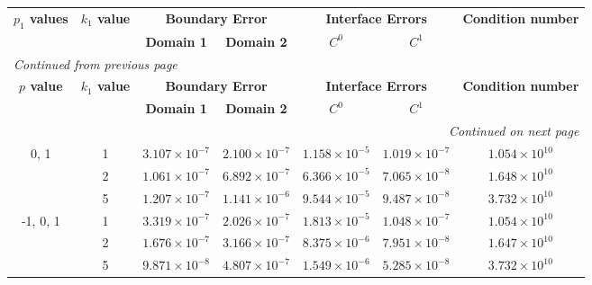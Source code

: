 \begin{table}[htbp]
    \centering
    \begin{longtable}{ccccccc}
        \toprule
        \multicolumn{1}{c}{\textbf{\(p_1\) values}} & \multicolumn{1}{c}{\textbf{\(k_1\) value}} & \multicolumn{2}{c}{\textbf{Boundary Error}} & \multicolumn{2}{c}{\textbf{Interface Errors}} & \multicolumn{1}{c}{\textbf{Condition number}} \\
        \cmidrule(lr){2-2} \cmidrule(lr){3-4} \cmidrule(lr){5-6} \cmidrule(lr){7-7}
        & & \textbf{Domain 1} & \textbf{Domain 2} & \textbf{\(C^0\)} & \textbf{\(C^1\)} & \\
        \midrule
        \endfirsthead %
        \multicolumn{7}{l}{{\footnotesize\emph{Continued from previous page}}} \\
        \toprule
        \multicolumn{1}{c}{\textbf{\(p\) value}} & \multicolumn{1}{c}{\textbf{\(k_1\) value}} & \multicolumn{2}{c}{\textbf{Boundary Error}} & \multicolumn{2}{c}{\textbf{Interface Errors}} & \multicolumn{1}{c}{\textbf{Condition number}} \\
        \cmidrule(lr){2-2} \cmidrule(lr){3-4} \cmidrule(lr){5-6} \cmidrule(lr){7-7}
        & & \textbf{Domain 1} & \textbf{Domain 2} & \textbf{\(C^0\)} & \textbf{\(C^1\)} & \\
        \midrule
        \endhead %
        \midrule[\heavyrulewidth] %
        \multicolumn{7}{r}{{\footnotesize\emph{Continued on next page}}} \\
        \endfoot %
        \bottomrule
        \endlastfoot %
        
        0, 1 & 1 & $3.107\times10^{-7}$ & $2.100\times10^{-7}$ & $1.158\times10^{-5}$ & $1.019\times10^{-7}$ & $1.054\times10^{10}$ \\
        & 2 & $1.061\times10^{-7}$ & $6.892\times10^{-7}$ & $6.366\times10^{-5}$ & $7.065\times10^{-8}$ & $1.648\times10^{10}$ \\
        & 5 & $1.207\times10^{-7}$ & $1.141\times10^{-6}$ & $9.544\times10^{-5}$ & $9.487\times10^{-8}$ & $3.732\times10^{10}$ \\
        \midrule[\heavyrulewidth] %
        
        -1, 0, 1 & 1 & $3.319\times10^{-7}$ & $2.026\times10^{-7}$ & $1.813\times10^{-5}$ & $1.048\times10^{-7}$ & $1.054\times10^{10}$ \\
        & 2 & $1.676\times10^{-7}$ & $3.166\times10^{-7}$ & $8.375\times10^{-6}$ & $7.951\times10^{-8}$ & $1.647\times10^{10}$ \\
        & 5 & $9.871\times10^{-8}$ & $4.807\times10^{-7}$ & $1.549\times10^{-6}$ & $5.285\times10^{-8}$ & $3.732\times10^{10}$ \\
        \midrule[\heavyrulewidth] %


\end{longtable}
\end{table}
